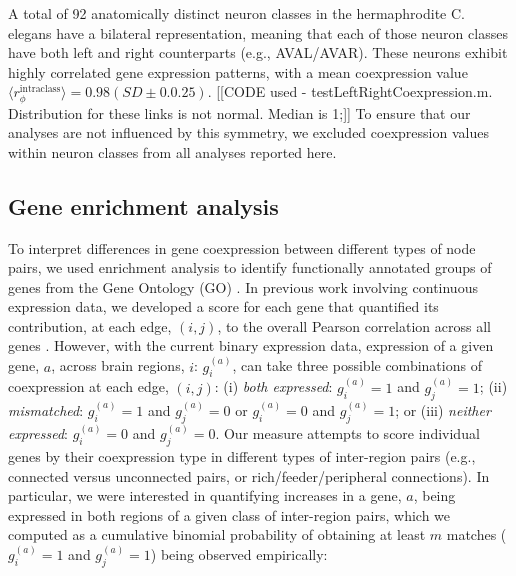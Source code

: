 \documentclass[10pt,letterpaper]{article}
\begin{document}
A total of 92 anatomically distinct neuron classes in the hermaphrodite C. elegans have a bilateral representation, meaning that each of those neuron classes have both left and right counterparts (e.g., AVAL/AVAR).
These neurons exhibit highly correlated gene expression patterns, with a mean coexpression value $\langle r_\phi^{\mathrm{intraclass}} \rangle = 0.98 (SD\pm0.0.25)$.
[[CODE used - testLeftRightCoexpression.m. Distribution for these links is not normal. Median is 1;]]
To ensure that our analyses are not influenced by this symmetry, we excluded coexpression values within neuron classes from all analyses reported here.

\subsection*{Gene enrichment analysis}
To interpret differences in gene coexpression between different types of node pairs, we used enrichment analysis to identify functionally annotated groups of genes from the Gene Ontology (GO) \cite{Ashburner2000}.
In previous work involving continuous expression data, we developed a score for each gene that quantified its contribution, at each edge, $(i,j)$, to the overall Pearson correlation across all genes \cite{Fulcher:2016ck}.
However, with the current binary expression data, expression of a given gene, $a$, across brain regions, $i$: $g^{(a)}_i$, can take three possible combinations of coexpression at each edge, $(i,j)$:
(i) \emph{both expressed}: $g^{(a)}_i = 1$ and $g^{(a)}_j = 1$;
(ii) \emph{mismatched}: $g^{(a)}_i = 1$ and $g^{(a)}_j = 0$ or $g^{(a)}_i = 0$ and $g^{(a)}_j = 1$; or
(iii) \emph{neither expressed}: $g^{(a)}_i = 0$ and $g^{(a)}_j = 0$.
Our measure attempts to score individual genes by their coexpression type in different types of inter-region pairs (e.g., connected versus unconnected pairs, or rich/feeder/peripheral connections).
In particular, we were interested in quantifying increases in a gene, $a$, being expressed in both regions of a given class of inter-region pairs, which we computed as a cumulative binomial probability of obtaining at least $m$ matches ($g^{(a)}_i = 1$ and $g^{(a)}_j = 1$) being observed empirically:
\end{document}
